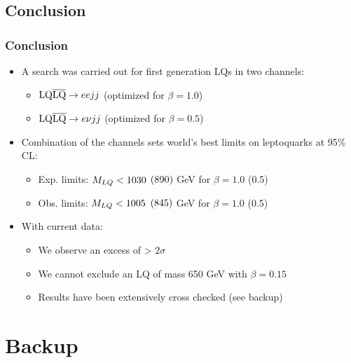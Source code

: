 \documentclass[bigger]{beamer}
\begin{document}
\subsection{Conclusion}
\label{sec-6-1}
\begin{frame}
\frametitle{Conclusion}
\label{sec-6-1-1}
\label{sec-6-1-1-1}

\ChangeItemFont{\footnotesize}{\footnotesize}{\footnotesize}
\begin{itemize}
\item A search was carried out for first generation LQs in two channels:
\begin{itemize}
\item $\text{LQ}\overline{\text{LQ}}\rightarrow eejj$  (optimized for $\beta = 1.0$)
\item $\text{LQ}\overline{\text{LQ}}\rightarrow e\nu jj$ (optimized for $\beta = 0.5$)
\end{itemize}
\item Combination of the channels sets world's best limits on leptoquarks at 95\% CL:
\begin{itemize}
\item Exp. limits: $M_{LQ} < 1030$ $(890)$ GeV for $\beta = 1.0$ (0.5)
\item Obs. limits: $M_{LQ} < 1005$ $(845)$ GeV for $\beta = 1.0$ (0.5)
\end{itemize}
\item With current data:
\begin{itemize}
\item We observe an excess of > $2\sigma$
\item We cannot exclude an LQ of mass 650 GeV with $\beta = 0.15$
\item Results have been extensively cross checked (see backup)
\end{itemize}
\end{itemize}
\end{frame}
\section{Backup}
\label{sec-7}
\end{document}
